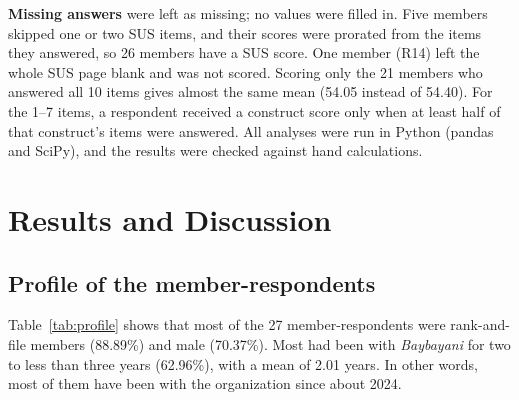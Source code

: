 \documentclass[11pt,a4paper]{article}
\begin{document}
\textbf{Missing answers} were left as missing; no values were filled in. Five members skipped one or two SUS items, and their scores were prorated from the items they answered, so 26 members have a SUS score. One member (R14) left the whole SUS page blank and was not scored. Scoring only the 21 members who answered all 10 items gives almost the same mean (54.05 instead of 54.40). For the 1--7 items, a respondent received a construct score only when at least half of that construct's items were answered. All analyses were run in Python (pandas and SciPy), and the results were checked against hand calculations.

\section{Results and Discussion}

\subsection{Profile of the member-respondents}

Table~\ref{tab:profile} shows that most of the 27 member-respondents were rank-and-file members (88.89\%) and male (70.37\%). Most had been with \textit{Baybayani} for two to less than three years (62.96\%), with a mean of 2.01 years. In other words, most of them have been with the organization since about 2024.
\end{document}
